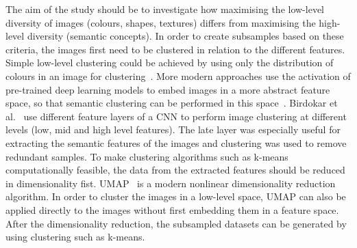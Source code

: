 The aim of the study should be to investigate how maximising the low-level diversity of images (colours, shapes, textures) differs from maximising the high-level diversity (semantic concepts). In order to create subsamples based on these criteria, the images first need to be clustered in relation to the different features. Simple low-level clustering could be achieved by using only the distribution of colours in an image for clustering~\cite{maheshwariImageClusteringUsing2009}. More modern approaches use the activation of pre-trained deep learning models to embed images in a more abstract feature space, so that semantic clustering can be performed in this space~\cite{chang2017deep}. Birdokar et al.~\cite{birodkarSemanticRedundanciesImageClassification2019} use different feature layers of a CNN to perform image clustering at different levels (low, mid and high level features). The late layer was especially useful for extracting the semantic features of the images and clustering was used to remove redundant samples. To make clustering algorithms such as k-means computationally feasible, the data from the extracted features should be reduced in dimensionality fist. UMAP~\cite{mcinnesUMAPUniformManifold2018} is a modern nonlinear dimensionality reduction algorithm. In order to cluster the images in a low-level space, UMAP can also be applied directly to the images without first embedding them in a feature space. After the dimensionality reduction, the subsampled datasets can be generated by using clustering such as k-means.



